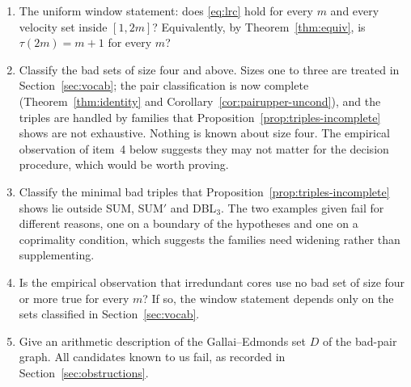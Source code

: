 \documentclass[11pt]{amsart}
\theoremstyle{plain}
\theoremstyle{definition}
\begin{document}
\begin{enumerate}
\item The uniform window statement: does \eqref{eq:lrc} hold for every $m$ and every velocity set
inside $[1,2m]$? Equivalently, by Theorem~\ref{thm:equiv}, is $\tau(2m) = m+1$ for every $m$?
\item Classify the bad sets of size four and above. Sizes one to three are treated in
Section~\ref{sec:vocab}; the pair classification is now complete
(Theorem~\ref{thm:identity} and Corollary~\ref{cor:pairupper-uncond}), and the triples are handled
by families that Proposition~\ref{prop:triples-incomplete} shows are not exhaustive. Nothing is
known about size four. The empirical observation of item~4 below suggests they may not matter for
the decision procedure, which would be worth proving.
\item Classify the minimal bad triples that Proposition~\ref{prop:triples-incomplete} shows lie
outside SUM, SUM$'$ and DBL$_3$. The two examples given fail for different reasons, one on a
boundary of the hypotheses and one on a coprimality condition, which suggests the families need
widening rather than supplementing.
\item Is the empirical observation that irredundant cores use no bad set of size four or more true
for every $m$? If so, the window statement depends only on the sets classified in
Section~\ref{sec:vocab}.
\item Give an arithmetic description of the Gallai--Edmonds set $D$ of the bad-pair graph. All
candidates known to us fail, as recorded in Section~\ref{sec:obstructions}.
\end{enumerate}
\end{document}
